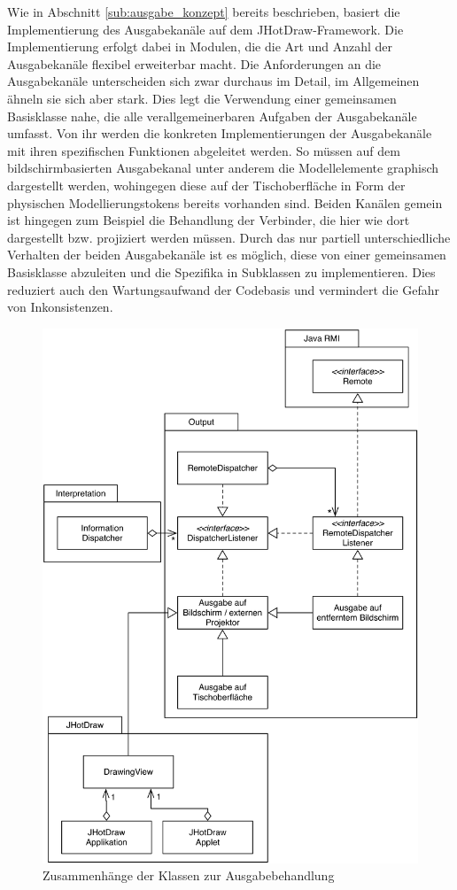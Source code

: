 Wie in Abschnitt \ref{sub:ausgabe_konzept} bereits beschrieben, basiert die Implementierung des Ausgabekanäle auf dem JHotDraw-Framework. Die Implementierung erfolgt dabei in Modulen, die die Art und Anzahl der Ausgabekanäle flexibel erweiterbar macht. Die Anforderungen an die Ausgabekanäle unterscheiden sich zwar durchaus im Detail, im Allgemeinen ähneln sie sich aber stark. Dies legt die Verwendung einer gemeinsamen Basisklasse nahe, die alle verallgemeinerbaren Aufgaben der Ausgabekanäle umfasst. Von ihr werden die konkreten Implementierungen der Ausgabekanäle mit ihren spezifischen Funktionen abgeleitet werden. So müssen auf dem bildschirmbasierten Ausgabekanal unter anderem die Modellelemente graphisch dargestellt werden, wohingegen diese auf der Tischoberfläche in Form der physischen Modellierungstokens bereits vorhanden sind. Beiden Kanälen gemein ist hingegen zum Beispiel die Behandlung der Verbinder, die hier wie dort dargestellt bzw. projiziert werden müssen. Durch das nur partiell unterschiedliche Verhalten der beiden Ausgabekanäle ist es möglich, diese von einer gemeinsamen Basisklasse abzuleiten und die Spezifika in Subklassen zu implementieren. Dies reduziert auch den Wartungsaufwand der Codebasis und vermindert die Gefahr von Inkonsistenzen. 

\begin{figure}[htbp]
	\centering
		\includegraphics[width=13cm]{img/ImplementierungOutput/OutputClasses.png}
	\caption{Zusammenhänge der Klassen zur Ausgabebehandlung}
	\label{fig:img_ImplementierungOutput_OutputClasses}
\end{figure}

